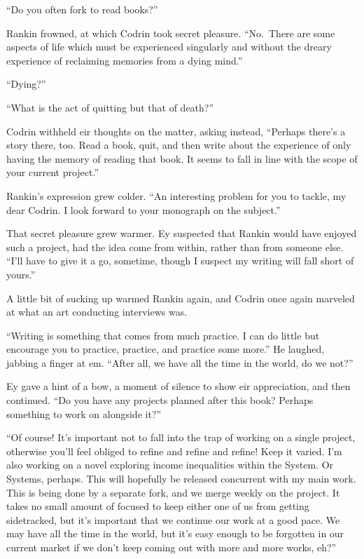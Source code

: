 ``Do you often fork to read books?''

Rankin frowned, at which Codrin took secret pleasure. ``No.~There are some aspects of life which must be experienced singularly and without the dreary experience of reclaiming memories from a dying mind.''

``Dying?''

``What is the act of quitting but that of death?''

Codrin withheld eir thoughts on the matter, asking instead, ``Perhaps there's a story there, too. Read a book, quit, and then write about the experience of only having the memory of reading that book. It seems to fall in line with the scope of your current project.''

Rankin's expression grew colder. ``An interesting problem for you to tackle, my dear Codrin. I look forward to your monograph on the subject.''

That secret pleasure grew warmer. Ey suspected that Rankin would have enjoyed such a project, had the idea come from within, rather than from someone else. ``I'll have to give it a go, sometime, though I suspect my writing will fall short of yours.''

A little bit of sucking up warmed Rankin again, and Codrin once again marveled at what an art conducting interviews was.

``Writing is something that comes from much practice. I can do little but encourage you to practice, practice, and practice some more.'' He laughed, jabbing a finger at em. ``After all, we have all the time in the world, do we not?''

Ey gave a hint of a bow, a moment of silence to show eir appreciation, and then continued. ``Do you have any projects planned after this book? Perhaps something to work on alongside it?''

``Of course! It's important not to fall into the trap of working on a single project, otherwise you'll feel obliged to refine and refine and refine! Keep it varied. I'm also working on a novel exploring income inequalities within the System. Or Systems, perhaps. This will hopefully be released concurrent with my main work. This is being done by a separate fork, and we merge weekly on the project. It takes no small amount of focused to keep either one of us from getting sidetracked, but it's important that we continue our work at a good pace. We may have all the time in the world, but it's easy enough to be forgotten in our current market if we don't keep coming out with more and more works, eh?''

